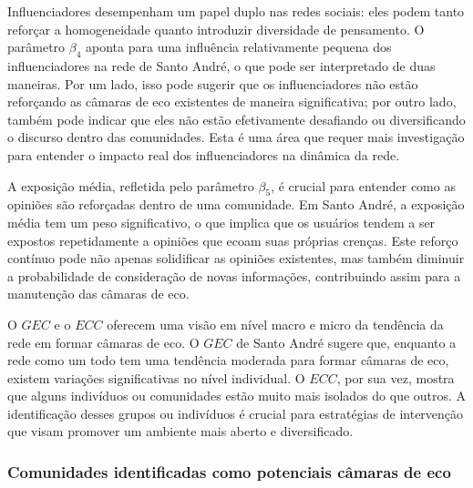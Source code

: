 Influenciadores desempenham um papel duplo nas redes sociais: eles podem tanto reforçar a homogeneidade quanto introduzir diversidade de pensamento. O parâmetro $\beta_4$ aponta para uma influência relativamente pequena dos influenciadores na rede de Santo André, o que pode ser interpretado de duas maneiras. Por um lado, isso pode sugerir que os influenciadores não estão reforçando as câmaras de eco existentes de maneira significativa; por outro lado, também pode indicar que eles não estão efetivamente desafiando ou diversificando o discurso dentro das comunidades. Esta é uma área que requer mais investigação para entender o impacto real dos influenciadores na dinâmica da rede.

A exposição média, refletida pelo parâmetro $\beta_5$, é crucial para entender como as opiniões são reforçadas dentro de uma comunidade. Em Santo André, a exposição média tem um peso significativo, o que implica que os usuários tendem a ser expostos repetidamente a opiniões que ecoam suas próprias crenças. Este reforço contínuo pode não apenas solidificar as opiniões existentes, mas também diminuir a probabilidade de consideração de novas informações, contribuindo assim para a manutenção das câmaras de eco.

O $GEC$ e o $ECC$ oferecem uma visão em nível macro e micro da tendência da rede em formar câmaras de eco. O $GEC$ de Santo André sugere que, enquanto a rede como um todo tem uma tendência moderada para formar câmaras de eco, existem variações significativas no nível individual. O $ECC$, por sua vez, mostra que alguns indivíduos ou comunidades estão muito mais isolados do que outros. A identificação desses grupos ou indivíduos é crucial para estratégias de intervenção que visam promover um ambiente mais aberto e diversificado.

\subsubsection*{Comunidades identificadas como potenciais câmaras de eco}

